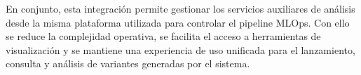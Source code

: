 En conjunto, esta integración permite gestionar los servicios auxiliares de análisis desde la misma plataforma utilizada para controlar el pipeline MLOps. Con ello se reduce la complejidad operativa, se facilita el acceso a herramientas de visualización y se mantiene una experiencia de uso unificada para el lanzamiento, consulta y análisis de variantes generadas por el sistema.

